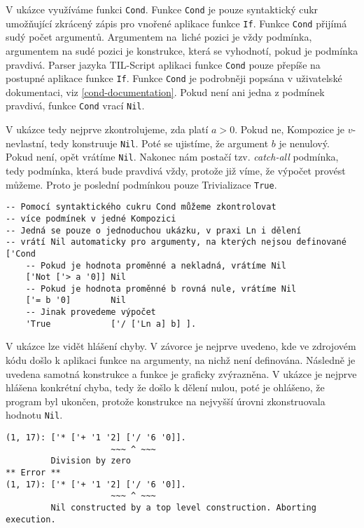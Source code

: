V ukázce využíváme funkci \lstinline{Cond}. Funkce \lstinline{Cond} je pouze syntaktický cukr
umožňující zkrácený zápis pro vnořené aplikace funkce \lstinline{If}. Funkce \lstinline{Cond}
přijímá sudý počet argumentů. Argumentem na~liché pozici je vždy podmínka, argumentem na sudé pozici
je konstrukce, která se vyhodnotí, pokud je podmínka pravdivá. Parser jazyka TIL-Script aplikaci
funkce \lstinline{Cond} pouze přepíše na postupné aplikace funkce \lstinline{If}. Funkce
\lstinline{Cond} je podrobněji popsána v uživatelské dokumentaci, viz \ref{cond-documentation}.
Pokud není ani jedna z podmínek pravdivá, funkce \lstinline{Cond} vrací \lstinline{Nil}.

V ukázce tedy nejprve zkontrolujeme, zda platí $a > 0$. Pokud ne, Kompozice je $v$-nevlastní, tedy
konstruuje \lstinline{Nil}. Poté se ujistíme, že argument $b$ je nenulový. Pokud není, opět vrátíme
\lstinline{Nil}. Nakonec nám postačí tzv. \textit{catch-all} podmínka, tedy podmínka, která bude
pravdivá vždy, protože již víme, že výpočet provést můžeme. Proto je poslední podmínkou pouze
Trivializace \lstinline{True}.

\begin{lstlisting}[caption={Příklad využití Nil},label=nil-example]
-- Pomocí syntaktického cukru Cond můžeme zkontrolovat
-- více podmínek v jedné Kompozici
-- Jedná se pouze o jednoduchou ukázku, v praxi Ln i dělení
-- vrátí Nil automaticky pro argumenty, na kterých nejsou definované
['Cond
    -- Pokud je hodnota proměnné a nekladná, vrátíme Nil
    ['Not ['> a '0]] Nil
    -- Pokud je hodnota proměnné b rovná nule, vrátíme Nil
    ['= b '0]        Nil
    -- Jinak provedeme výpočet
    'True            ['/ ['Ln a] b] ].
\end{lstlisting}

V ukázce  lze vidět hlášení chyby. V závorce je nejprve uvedeno,
kde ve zdrojovém kódu došlo k aplikaci funkce na argumenty, na nichž není definována. Následně
je uvedena samotná konstrukce a funkce je graficky zvýrazněna. V ukázce je nejprve hlášena konkrétní
chyba, tedy že došlo k dělení nulou, poté je ohlášeno, že program byl ukončen, protože konstrukce
na nejvyšší úrovni zkonstruovala hodnotu \lstinline{Nil}.

\begin{lstlisting}[caption={Příklad hlášení chyby},label=error-reporting-on-nil]
(1, 17): ['* ['+ '1 '2] ['/ '6 '0]].
                     ~~~ ^ ~~~
         Division by zero
** Error **
(1, 17): ['* ['+ '1 '2] ['/ '6 '0]].
                     ~~~ ^ ~~~
         Nil constructed by a top level construction. Aborting execution.
\end{lstlisting}

